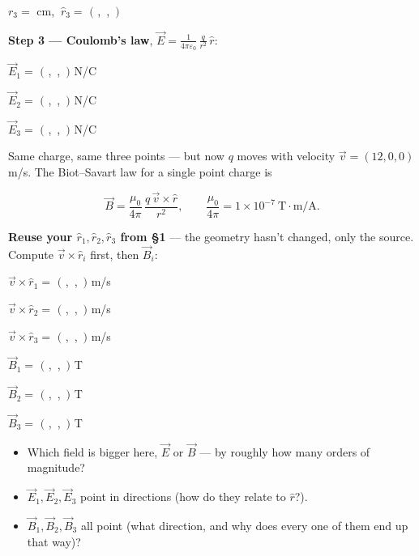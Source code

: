 \documentclass[12pt]{article}
\newcommand{\vecbl}[1][1.3cm]{$\big($\,\bl[#1]\,, \bl[#1]\,, \bl[#1]\,$\big)$}
\begin{document}
$r_3 = $ \bl[1.2cm] cm, $\ \hat r_3 = $ \vecbl

\textbf{Step 3 --- Coulomb's law}, $\displaystyle \vec E = \frac{1}{4\pi
\varepsilon_0}\,\frac{q}{r^2}\,\hat r$:

$\vec E_1 = $ \vecbl[1.6cm] N/C

$\vec E_2 = $ \vecbl[1.6cm] N/C

$\vec E_3 = $ \vecbl[1.6cm] N/C



Same charge, same three points --- but now $q$ moves with velocity
$\vec v = (12,0,0)$ m/s. The Biot--Savart law for a single point charge is

\[
\vec B = \frac{\mu_0}{4\pi}\,\frac{q\,\vec v\times\hat r}{r^2}, \qquad
\frac{\mu_0}{4\pi} = 1\times10^{-7}\ \text{T}\!\cdot\!\text{m/A}.
\]

\textbf{Reuse your $\hat r_1,\hat r_2,\hat r_3$ from \S1} --- the geometry
hasn't changed, only the source. Compute $\vec v\times\hat r_i$ first, then
$\vec B_i$:

$\vec v\times\hat r_1 = $ \vecbl[1.4cm] m/s

$\vec v\times\hat r_2 = $ \vecbl[1.4cm] m/s

$\vec v\times\hat r_3 = $ \vecbl[1.4cm] m/s

$\vec B_1 = $ \vecbl[1.6cm] T

$\vec B_2 = $ \vecbl[1.6cm] T

$\vec B_3 = $ \vecbl[1.6cm] T



\begin{itemize}[itemsep=6pt,parsep=2pt,topsep=2pt]
\item Which field is bigger here, $\vec E$ or $\vec B$ --- by roughly how
many orders of magnitude? \bl[9cm]
\item $\vec E_1,\vec E_2,\vec E_3$ point in \bl[7cm] directions (how do they
relate to $\hat r$?).
\item $\vec B_1,\vec B_2,\vec B_3$ all point \bl[7cm] (what direction, and
why does every one of them end up that way)?
\end{itemize}
\end{document}
